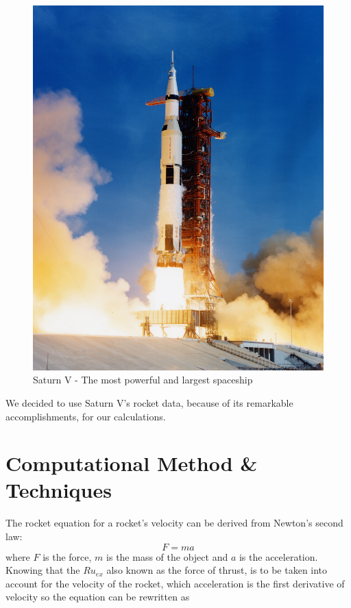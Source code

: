 \documentclass[11pt]{article}
\begin{document}
\begin{figure}[H]
\centering
\includegraphics[scale=0.35]{SaturnV.jpg}
\caption{Saturn V - The most powerful and largest spaceship}
\end{figure}

\vspace{.25cm}

We decided to use Saturn V's rocket data, because of its remarkable accomplishments, for our calculations.

\section{Computational Method \& Techniques}
The rocket equation for a rocket's velocity can be derived from Newton's second law:
\begin{equation}
F = ma
\end{equation}
where $F$ is the force, $m$ is the mass of the object and $a$ is the acceleration. Knowing that the $Ru_{ex}$ also known as the force of thrust, is to be taken into account for the velocity of the rocket, which acceleration is the first derivative of velocity so the equation can be rewritten as
\end{document}
